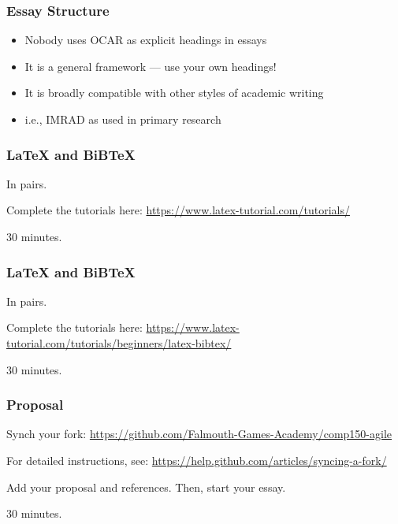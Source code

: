 \begin{frame}
	\frametitle{Essay Structure}
	
	\begin{itemize}
		\item Nobody uses OCAR as explicit headings in essays
		\item It is a general framework --- use your own headings!
		\item It is broadly compatible with other styles of academic writing
		\item i.e., IMRAD as used in primary research
	\end{itemize}
\end{frame}

\begin{frame}
	\frametitle{LaTeX and BiBTeX}
	
	In pairs.
	
	\vspace{2em}
	
	Complete the tutorials here:
	\url{https://www.latex-tutorial.com/tutorials/}
	
	\vspace{2em}
	
	30 minutes.	
	
\end{frame}

\begin{frame}
	\frametitle{LaTeX and BiBTeX}
	
	In pairs.
	
	\vspace{2em}
	
	Complete the tutorials here:
	\url{https://www.latex-tutorial.com/tutorials/beginners/latex-bibtex/}
	
	\vspace{2em}
	
	30 minutes.	
	
\end{frame}

\begin{frame}
	\frametitle{Proposal}
	
	Synch your fork:
	\url{https://github.com/Falmouth-Games-Academy/comp150-agile}
	
	\vspace{2em}
	
	For detailed instructions, see:
	\url{https://help.github.com/articles/syncing-a-fork/}
	
	\vspace{2em}
	
	Add your proposal and references. Then, start your essay.
	
	\vspace{2em}
	
	30 minutes.	
	
\end{frame}


